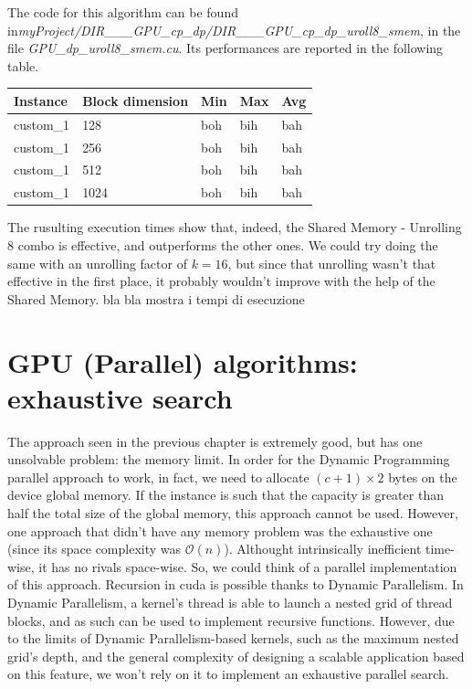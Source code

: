 \documentclass[12pt]{extarticle}
\begin{document}
The code for this algorithm can be found in\newline \emph{myProject/DIR\_\_\_GPU\_cp\_dp/DIR\_\_\_GPU\_cp\_dp\_uroll8\_smem}, in the file \emph{GPU\_dp\_uroll8\_smem.cu}.\newline
Its performances are reported in the following table.
\begin{center}
\begin{tabular}{ | m{2.2cm} | m{3.2cm} | m{2.2cm} | m{2.2cm} | m{2.2cm} |}
 \hline
 Instance & Block dimension & Min & Max & Avg\\
 \hline
 custom\_1 & 128 & boh & bih & bah\\
 \hline
 custom\_1 & 256 & boh & bih & bah\\
 \hline
 custom\_1 & 512 & boh & bih & bah\\
 \hline
 custom\_1 & 1024 & boh & bih & bah\\
 \hline
 \end{tabular}
 \end{center}
The rusulting execution times show that, indeed, the Shared Memory - Unrolling 8 combo is effective, and outperforms the other ones. We could try doing the same with an unrolling factor of $k=16$, but since that unrolling wasn't that effective in the first place, it probably wouldn't improve with the help of the Shared Memory.
bla bla mostra i tempi di esecuzione
\section{GPU (Parallel) algorithms: exhaustive search}
\label{GPU-exhaustive-section}
The approach seen in the previous chapter is extremely good, but has one unsolvable problem: the memory limit. In order for the Dynamic Programming parallel approach to work, in fact, we need to allocate $(c + 1) \times 2$ bytes on the device global memory. If the instance is such that the capacity is greater than half the total size of the global memory, this approach cannot be used. However, one approach that didn't have any memory problem was the exhaustive one (since its space complexity was $\mathcal{O}(n)$). Althought intrinsically inefficient time-wise, it has no rivals space-wise. So, we could think of a parallel implementation of this approach.\newline
Recursion in cuda is possible thanks to Dynamic Parallelism. In Dynamic Parallelism, a kernel's thread is able to launch a nested grid of thread blocks, and as such can be used to implement recursive functions. However, due to the limits of Dynamic Parallelism-based kernels, such as the maximum nested grid's depth, and the general complexity of designing a scalable application based on this feature, we won't rely on it to implement an exhaustive parallel search.
\end{document}
